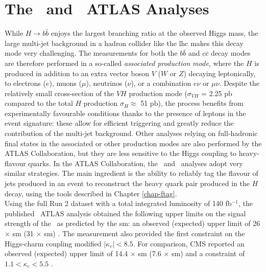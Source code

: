 \section[The \vhb\ and \vhc\ ATLAS Analyses]{The \boldvhb\ and \boldvhc\ ATLAS Analyses}
While $H \rightarrow b\bar{b}$ enjoys the largest branching ratio at the observed Higgs mass, the large multi-jet background in a hadron collider like the \gls{lhc} makes this decay mode very challenging. The measurements for both the $b\bar{b}$ and $c\bar{c}$ decay modes are therefore performed in a so-called \textit{associated production mode}, where the $H$ is produced in addition to an extra vector boson $V$ ($W$ or $Z$) decaying leptonically, to electrons ($e$), muons ($\mu$), neutrinos ($\nu$), or a combination $e\nu$ or $\mu\nu$. Despite the relatively small cross-section of the $VH$ production mode ($\sigma_{VH}$ = 2.25 pb compared to the total $H$ production $\sigma_H \approx$ 51 pb), the process benefits from experimentally favourable conditions thanks to the presence of leptons in the event signature: these allow for efficient triggering and greatly reduce the contribution of the multi-jet background. Other analyses relying on full-hadronic final states in the associated or other production modes are also performed by the ATLAS Collaboration, but they are less sensitive to the Higgs coupling to heavy-flavour quarks. In the ATLAS Collaboration, the \vhb\ and \vhc\ analyses adopt very similar strategies. The main ingredient is the ability to reliably tag the flavour of jets produced in an event to reconstruct the heavy quark pair produced in the $H$ decay, using the tools described in Chapter \ref{chap-ftag}. \\ 

Using the full Run 2 dataset with a total integrated luminosity of 140 fb$^{-1}$, the published \vhc\ ATLAS analysis obtained the following upper limits on the signal strength of the \vhc\ as predicted by the \gls{sm}: an observed (expected) upper limit of 26 $\times$ \gls{sm} (31 $\times$ \gls{sm}) \cite{Collaboration:2721696}. The measurement also provided the first constraint on the Higgs-charm coupling modified $|\kappa_c| < 8.5$. For comparison, CMS reported an observed (expected) upper limit of 14.4 $\times$ \gls{sm} (7.6 $\times$ \gls{sm}) and a constraint of $1.1 < \kappa_c < 5.5$ \cite{arXiv:2205.05550}. \\ 

